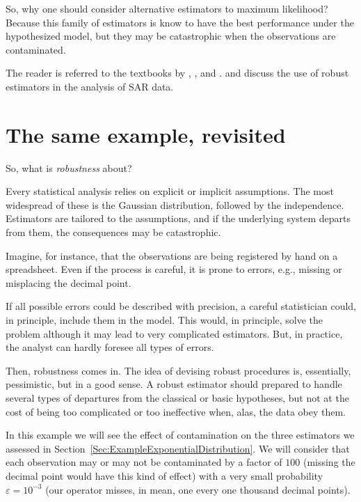 So, why one should consider alternative estimators to maximum likelihood?
Because this family of estimators is know to have the best performance under the hypothesized model, but they may be catastrophic when the observations are contaminated.

The reader is referred to the textbooks by
\citet{Huber81},
\citet{RobustStatisticsHuberRonchetti}, and
\citet{MaronnaMartinYohai:book:2006}.
\citet{BustosFreryLucini:Mestimators:2001} and \citet{AllendeFreryetal:JSCS:05} discuss the use of robust estimators in the analysis of SAR data.

\section{The same example, revisited}

So, what is \textit{robustness} about?

Every statistical analysis relies on explicit or implicit assumptions.
The most widespread of these is the Gaussian distribution, followed by the independence.
Estimators are tailored to the assumptions, and if the underlying system departs from them, the consequences may be catastrophic.

Imagine, for instance, that the observations are being registered by hand on a spreadsheet.
Even if the process is careful, it is prone to errors, e.g., missing or misplacing the decimal point.

If all possible errors could be described with precision, a careful statistician could, in principle, include them in the model.
This would, in principle, solve the problem although it may lead to very complicated estimators.
But, in practice, the analyst can hardly foresee all types of errors.

Then, robustness comes in.
The idea of devising robust procedures is, essentially, pessimistic, but in a good sense.
A robust estimator should prepared to handle several types of departures from the classical or basic hypotheses, but not at the cost of being too complicated or too ineffective when, alas, the data obey them.

In this example we will see the effect of contamination on the three estimators we assessed in Section~\ref{Sec:ExampleExponentialDistribution}.
We will consider that each observation may or may not be contaminated by a factor of $100$ (missing the decimal point would have this kind of effect) with a very small probability $\varepsilon=10^{-3}$ (our operator misses, in mean, one every one thousand decimal points).

